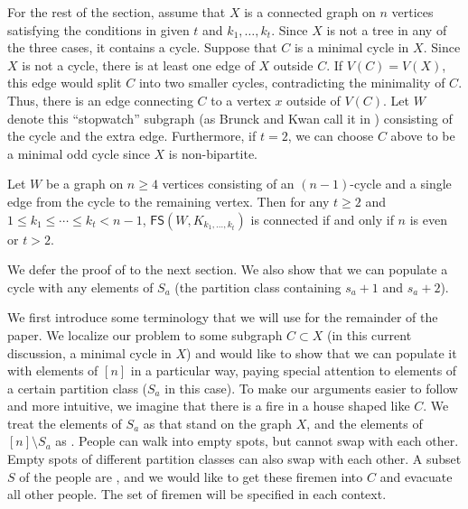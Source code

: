 \documentclass{mystyle}
\newcommand{\FS}{\mathsf{FS}}
\begin{document}
For the rest of the section, assume that $X$ is a connected graph on $n$ vertices satisfying the conditions in  given $t$ and $k_1, \ldots, k_t$. Since $X$ is not a tree in any of the three cases, it contains a cycle. Suppose that $C$ is a minimal cycle in $X$. Since $X$ is not a cycle, there is at least one edge of $X$ outside $C$. If $V(C) = V(X)$, this edge would split $C$ into two smaller cycles, contradicting the minimality of $C$. Thus, there is an edge connecting $C$ to a vertex $x$ outside of $V(C)$. Let $W$ denote this ``stopwatch'' subgraph (as Brunck and Kwan call it in \cite{brunck2023}) consisting of the cycle and the extra edge. Furthermore, if $t = 2$, we can choose $C$ above to be a minimal odd cycle since $X$ is non-bipartite. 
 
\begin{theorem}\label{thm_stopwatch}
    Let $W$ be a graph on $n \geq 4$ vertices consisting of an $(n-1)$-cycle and a single edge from the cycle to the remaining vertex. Then for any $t \geq 2$ and $1 \leq k_1 \leq \cdots \leq k_t < n - 1$, $\FS(W, K_{k_1, \ldots, k_t})$ is connected if and only if $n$ is even or $t > 2$.
\end{theorem}
We defer the proof of  to the next section. We also show that we can populate a cycle with any elements of $S_a$ (the partition class containing $s_a + 1$ and $s_a + 2$). 

We first introduce some terminology that we will use for the remainder of the paper. We localize our problem to some subgraph $C \subset X$ (in this current discussion, a minimal cycle in $X$) and would like to show that we can populate it with elements of $[n]$ in a particular way, paying special attention to elements of a certain partition class ($S_a$ in this case). To make our arguments easier to follow and more intuitive, we imagine that there is a fire in a house shaped like $C$. We treat the elements of $S_a$ as  that stand on the graph $X$, and the elements of $[n] \setminus S_a$ as . People can walk into empty spots, but cannot swap with each other. Empty spots of different partition classes can also swap with each other. A subset $S$ of the people are , and we would like to get these firemen into $C$ and evacuate all other people. The set of firemen will be specified in each context.
\end{document}
